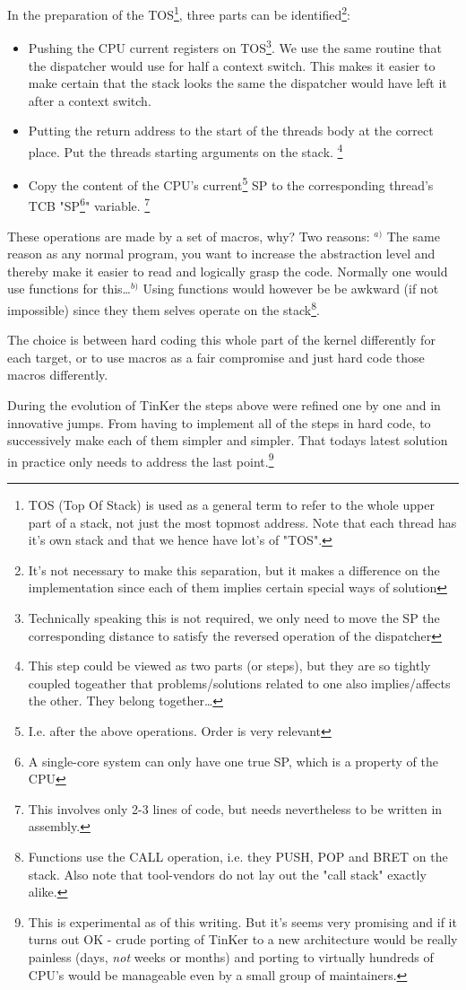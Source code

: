 {		In the preparation of the TOS\footnote{TOS (Top Of Stack) is used as a general term to refer to the whole upper part of a stack, not just the most topmost address. Note that each thread has it's own stack and that we hence have lot's of "TOS".}, three parts can be identified\footnote{It's not necessary to make this separation, but it makes a difference on the implementation since each of them implies certain special ways of solution}:
		\begin{itemize}
			\item Pushing the CPU current registers on TOS\footnote{Technically speaking this is not required, we only need to move the SP the corresponding distance to satisfy the reversed operation of the dispatcher}. We use the same routine that the dispatcher would use for half a context switch. This makes it easier to make certain that the stack looks the same the dispatcher would have left it after a context switch.
			\item Putting the return address to the start of the threads body at the correct place.  Put the threads starting arguments on the stack. \footnote{This step could be viewed as two parts (or steps), but they are so tightly coupled togeather that problems/solutions related to one also implies/affects the other. They belong together\ldots}	
			\item Copy the content of the CPU's current\footnote{I.e. after the above operations. Order is very relevant} SP to the corresponding thread's TCB "SP\footnote{A single-core system can only have one true SP, which is a property of the CPU}" variable. \footnote{This involves only 2-3 lines of code, but needs nevertheless to be written in assembly.}
		\end{itemize}
		These operations are made by a set of macros, why? Two reasons: $^{a)}$ The same reason as any normal program, you want to increase the abstraction level and thereby make it easier to read and logically grasp the code. Normally one would use functions for this\ldots $^{b)}$ Using functions would however be be awkward (if not impossible) since they them selves operate on the stack\footnote{Functions use the CALL operation, i.e. they PUSH, POP and BRET on the stack. Also note that tool-vendors do not lay out the "call stack" exactly alike.}.

		The choice is between hard coding this whole part of the kernel differently for each target, or to use macros as a fair compromise and just hard code those macros differently.

		During the evolution of TinKer the steps above were refined one by one and in innovative jumps. From having to implement all of the steps in hard code, to successively make each of them simpler and simpler. That todays latest solution in practice only needs to address the last point.\footnote{This is experimental as of this writing. But it's seems very promising and if it turns out OK - crude porting of TinKer to a new architecture would be really painless (days, \textit{not} weeks or months) and porting to virtually hundreds of CPU's would be manageable even by a small group of maintainers.}

}
